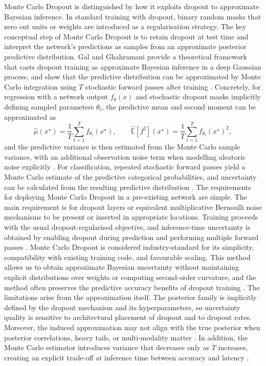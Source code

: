 Monte Carlo Dropout is distinguished by how it exploits dropout to approximate Bayesian inference. In standard training with dropout, binary random masks that zero out units or weights are introduced as a regularisation strategy. The key conceptual step of Monte Carlo Dropout is to retain dropout at test time and interpret the network's predictions as samples from an approximate posterior predictive distribution. Gal and Ghahramani provide a theoretical framework that casts dropout training as approximate Bayesian inference in a deep Gaussian process, and show that the predictive distribution can be approximated by Monte Carlo integration using $T$ stochastic forward passes after training \cite{Gal2016Dropout}. Concretely, for regression with a network output $f_{\theta}(x)$ and stochastic dropout masks implicitly defining sampled parameters $\theta_t$, the predictive mean and second moment can be approximated as
\begin{equation}
\hat{\mu}(x^\star) = \frac{1}{T}\sum_{t=1}^T f_{\theta_t}(x^\star),
\qquad
\widehat{\mathbb{E}}[f^2](x^\star)=\frac{1}{T}\sum_{t=1}^T f_{\theta_t}(x^\star)^2,
\end{equation}
and the predictive variance is then estimated from the Monte Carlo sample variance, with an additional observation noise term when modelling aleatoric noise explicitly \cite{Gal2016Dropout}. For classification, repeated stochastic forward passes yield a Monte Carlo estimate of the predictive categorical probabilities, and uncertainty can be calculated from the resulting predictive distribution \cite{Gal2016Dropout}. The requirements for deploying Monte Carlo Dropout in a pre-existing network are simple. The main requirement is for dropout layers or equivalent multiplicative Bernoulli noise mechanisms to be present or inserted in appropriate locations. Training proceeds with the usual dropout-regularised objective, and inference-time uncertainty is obtained by enabling dropout during prediction and performing multiple forward passes \cite{Gal2016Dropout}. Monte Carlo Dropout is considered industry-standard for its simplicity, compatibility with existing training code, and favourable scaling. This method allows us to obtain approximate Bayesian uncertainty without maintaining explicit distributions over weights or computing second-order curvature, and the method often preserves the predictive accuracy benefits of dropout training \cite{Gal2016Dropout}. The limitations arise from the approximation itself. The posterior family is implicitly defined by the dropout mechanism and its hyperparameters, so uncertainty quality is sensitive to architectural placement of dropout and to dropout rates. Moreover, the induced approximation may not align with the true posterior when posterior correlations, heavy tails, or multi-modality matter \cite{Gal2016Dropout}. In addition, the Monte Carlo estimator introduces variance that decreases only as $T$ increases, creating an explicit trade-off at inference time between accuracy and latency \cite{Gal2016Dropout}.

